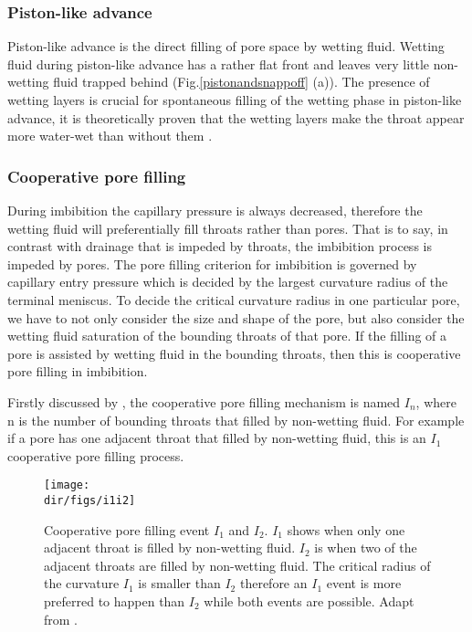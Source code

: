 \subsubsection{Piston-like advance}
Piston-like advance is the direct filling of pore space by wetting fluid. Wetting fluid during piston-like advance has a rather flat front and leaves very little non-wetting fluid trapped behind (Fig.\ref{pistonandsnappoff} (a)). The presence of wetting layers is crucial for spontaneous filling of the wetting phase in piston-like advance, it is theoretically proven that the wetting layers make the throat appear more water-wet than without them \citep{ma1996effect,oren1998extending}.

\subsubsection{Cooperative pore filling}
During imbibition the capillary pressure is always decreased, therefore the wetting fluid will preferentially fill throats rather than pores. That is to say, in contrast with drainage that is impeded by throats, the imbibition process is impeded by pores. The pore filling criterion for imbibition is governed by capillary entry pressure which is decided by the largest curvature radius of the terminal meniscus. To decide the critical curvature radius in one particular pore, we have to not only consider the size and shape of the pore, but also consider the wetting fluid saturation of the bounding throats of that pore. If the filling of a pore is assisted by wetting fluid in the bounding throats, then this is cooperative pore filling in imbibition.

Firstly discussed by \citet{lenormand1983mechanisms,  lenormand1984role}, the cooperative pore filling mechanism is named $I_n$, where n is the number of bounding throats that filled by non-wetting fluid. For example if a pore has one adjacent throat that filled by non-wetting fluid, this is an $I_1$ cooperative pore filling process.

\begin{figure}[htbp]
  \centering
  \texttt{[image: \\dir/figs/i1i2]}
  \caption{Cooperative pore filling event $I_1$ and $I_2$. $I_1$ shows when only one adjacent throat is filled by non-wetting fluid. $I_2$ is when two of the adjacent throats are filled by non-wetting fluid. The critical radius of the curvature $I_1$ is smaller than $I_2$ therefore an $I_1$ event is more preferred to happen than $I_2$ while both events are possible. Adapt from \citet{lenormand1984role}.}
  \label{i1i2}
\end{figure}

